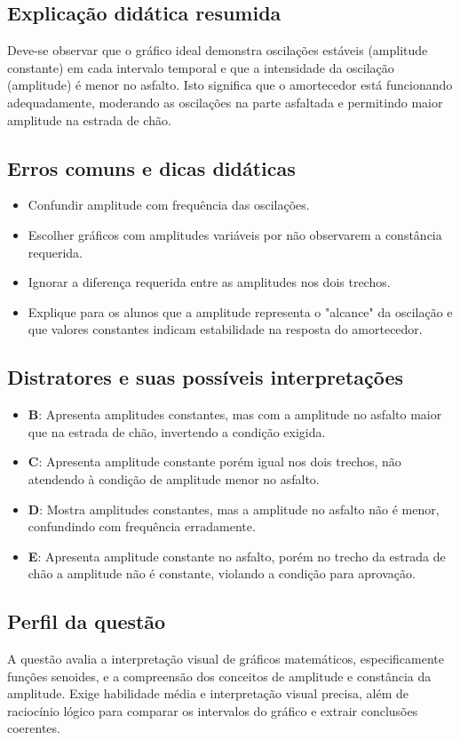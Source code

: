 \documentclass{article}
\begin{document}
\subsection*{Explicação didática resumida}
Deve-se observar que o gráfico ideal demonstra oscilações estáveis (amplitude constante) em cada intervalo temporal e que a intensidade da oscilação (amplitude) é menor no asfalto. Isto significa que o amortecedor está funcionando adequadamente, moderando as oscilações na parte asfaltada e permitindo maior amplitude na estrada de chão.

\subsection*{Erros comuns e dicas didáticas}
\begin{itemize}
  \item Confundir amplitude com frequência das oscilações.
  \item Escolher gráficos com amplitudes variáveis por não observarem a constância requerida.
  \item Ignorar a diferença requerida entre as amplitudes nos dois trechos.
  \item Explique para os alunos que a amplitude representa o "alcance" da oscilação e que valores constantes indicam estabilidade na resposta do amortecedor.
\end{itemize}

\subsection*{Distratores e suas possíveis interpretações}
\begin{itemize}
  \item \textbf{B}: Apresenta amplitudes constantes, mas com a amplitude no asfalto maior que na estrada de chão, invertendo a condição exigida.
  \item \textbf{C}: Apresenta amplitude constante porém igual nos dois trechos, não atendendo à condição de amplitude menor no asfalto.
  \item \textbf{D}: Mostra amplitudes constantes, mas a amplitude no asfalto não é menor, confundindo com frequência erradamente.
  \item \textbf{E}: Apresenta amplitude constante no asfalto, porém no trecho da estrada de chão a amplitude não é constante, violando a condição para aprovação.
\end{itemize}

\subsection*{Perfil da questão}
A questão avalia a interpretação visual de gráficos matemáticos, especificamente funções senoides, e a compreensão dos conceitos de amplitude e constância da amplitude. Exige habilidade média e interpretação visual precisa, além de raciocínio lógico para comparar os intervalos do gráfico e extrair conclusões coerentes.
\end{document}
